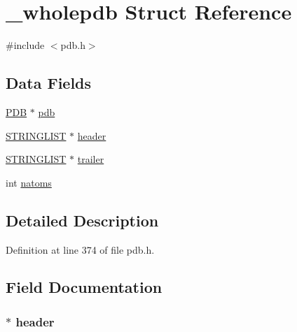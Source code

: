 \hypertarget{struct__wholepdb}{\section{\-\_\-wholepdb Struct Reference}
\label{struct__wholepdb}
}


{\ttfamily \#include $<$pdb.\-h$>$}

\subsection*{Data Fields}
\begin{DoxyCompactItemize}
\item 
\hyperlink{pdb_8h_aa31eb9fe57a50b29778e64bb131b22bf}{P\-D\-B} $\ast$ \hyperlink{struct__wholepdb_a9cac171f884f9ad8fd8dbb4d36b233a0}{pdb}
\item 
\hyperlink{general_8h_a9689e1c779b5f538d971aa687c441210}{S\-T\-R\-I\-N\-G\-L\-I\-S\-T} $\ast$ \hyperlink{struct__wholepdb_ab01306949a2d1004b803047de3781634}{header}
\item 
\hyperlink{general_8h_a9689e1c779b5f538d971aa687c441210}{S\-T\-R\-I\-N\-G\-L\-I\-S\-T} $\ast$ \hyperlink{struct__wholepdb_a26b5f2516c2bf97f561791a89d1912e1}{trailer}
\item 
int \hyperlink{struct__wholepdb_a2093ca3426a8f98873fe165a55bfa2b1}{natoms}
\end{DoxyCompactItemize}


\subsection{Detailed Description}


Definition at line 374 of file pdb.\-h.



\subsection{Field Documentation}
\hypertarget{struct__wholepdb_ab01306949a2d1004b803047de3781634}{
\subsubsection[{header}]{$\ast$ header}}\label{struct__wholepdb_ab01306949a2d1004b803047de3781634}



